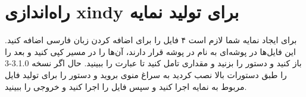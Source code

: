 \section{راه‌اندازی xindy برای تولید نمایه}
برای ایجاد نمایه شما لازم است ۴ فایل را برای اضافه کردن زبان فارسی اضافه کنید. این فایل‌ها در پوشه‌ای به نام  در پوشه  قرار دارند، آن‌ها را در مسیر  کپی کنید و بعد  را باز کنید و دستور  را بزنید و مقداری تامل کنید تا عبارت  را ببینید. حال اگر  نسخه 3.1.0-3 را طبق دستورات بالا نصب کردید به سراغ منوی  بروید و دستور  را برای تولید فایل مربوط به نمایه اجرا کنید و سپس فایل را اجرا کنید و خروجی را ببینید.